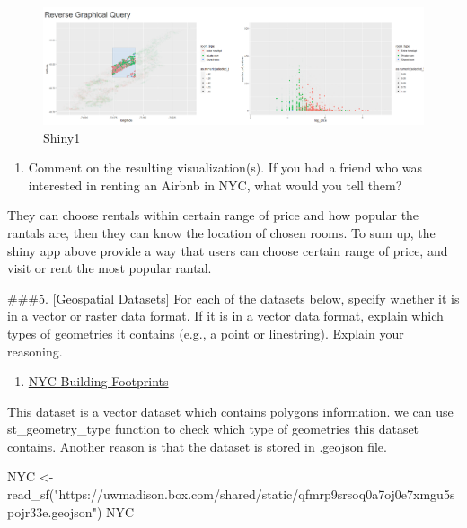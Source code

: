 \documentclass[
]{article}
\newenvironment{Shaded}{\begin{snugshade}}{\end{snugshade}}
\newcommand{\FunctionTok}[1]{\textcolor[rgb]{0.00,0.00,0.00}{#1}}
\newcommand{\NormalTok}[1]{#1}
\newcommand{\OtherTok}[1]{\textcolor[rgb]{0.56,0.35,0.01}{#1}}
\newcommand{\StringTok}[1]{\textcolor[rgb]{0.31,0.60,0.02}{#1}}
\providecommand{\tightlist}{%
  \setlength{\itemsep}{0pt}\setlength{\parskip}{0pt}}
\begin{document}
\begin{figure}
\centering
\includegraphics{Shiny1.png}
\caption{Shiny1}
\end{figure}

\begin{enumerate}
\def\labelenumi{\alph{enumi}.}
\setcounter{enumi}{3}
\tightlist
\item
  Comment on the resulting visualization(s). If you had a friend who was
  interested in renting an Airbnb in NYC, what would you tell them?
\end{enumerate}

They can choose rentals within certain range of price and how popular
the rantals are, then they can know the location of chosen rooms. To sum
up, the shiny app above provide a way that users can choose certain
range of price, and visit or rent the most popular rantal.

\#\#\#5. {[}Geospatial Datasets{]} For each of the datasets below,
specify whether it is in a vector or raster data format. If it is in a
vector data format, explain which types of geometries it contains (e.g.,
a point or linestring). Explain your reasoning.

\begin{enumerate}
\def\labelenumi{\alph{enumi}.}
\tightlist
\item
  \href{https://uwmadison.box.com/shared/static/qfmrp9srsoq0a7oj0e7xmgu5spojr33e.geojson}{NYC
  Building Footprints}
\end{enumerate}

This dataset is a vector dataset which contains polygons information. we
can use st\_geometry\_type function to check which type of geometries
this dataset contains. Another reason is that the dataset is stored in
.geojson file.

\begin{Shaded}
\begin{Highlighting}[]
\NormalTok{NYC }\OtherTok{\textless{}{-}} \FunctionTok{read\_sf}\NormalTok{(}\StringTok{"https://uwmadison.box.com/shared/static/qfmrp9srsoq0a7oj0e7xmgu5spojr33e.geojson"}\NormalTok{)}
\NormalTok{NYC}
\end{Highlighting}
\end{Shaded}
\end{document}
